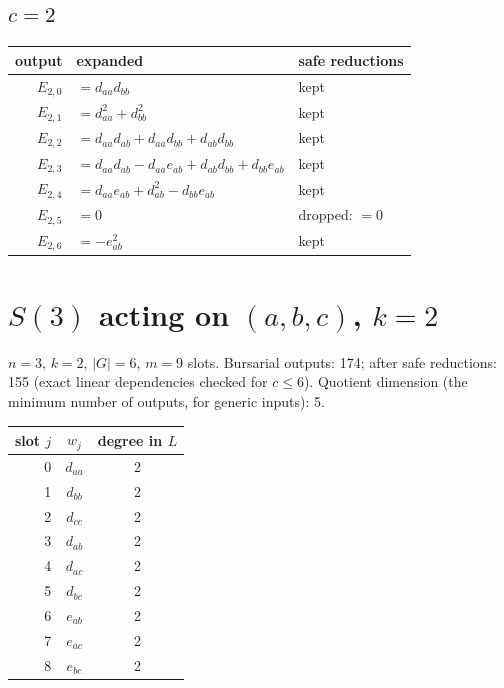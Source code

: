 \documentclass[10pt]{article}
\begin{document}
\subsection*{$c = 2$}
\begin{longtable}{r>{\raggedright\arraybackslash}p{}>{\raggedright\arraybackslash}p{}}
output & expanded & safe reductions \\ \hline
$E_{2,0}$ & $= d_{aa} d_{bb}$ & kept \\
$E_{2,1}$ & $= d_{aa}^{2} + d_{bb}^{2}$ & kept \\
$E_{2,2}$ & $= d_{aa} d_{ab} + d_{aa} d_{bb} + d_{ab} d_{bb}$ & kept \\
$E_{2,3}$ & $= d_{aa} d_{ab} - d_{aa} e_{ab} + d_{ab} d_{bb} + d_{bb} e_{ab}$ & kept \\
$E_{2,4}$ & $= d_{aa} e_{ab} + d_{ab}^{2} - d_{bb} e_{ab}$ & kept \\
$E_{2,5}$ & $= 0$ & dropped: $= 0$ \\
$E_{2,6}$ & $= - e_{ab}^{2}$ & kept \\
\end{longtable}

\clearpage
\section{$S(3)$ acting on $(a, b, c)$, $k = 2$}
$n = 3$, $k = 2$, $|G| = 6$, $m = 9$ slots. Bursarial outputs: 174; after safe reductions: 155 (exact linear dependencies checked for $c \le 6$). Quotient dimension (the minimum number of outputs, for generic inputs): 5.

\begin{longtable}{rcc}
slot $j$ & $w_j$ & degree in $L$ \\ \hline
0 & $d_{aa}$ & 2 \\
1 & $d_{bb}$ & 2 \\
2 & $d_{cc}$ & 2 \\ \hline
3 & $d_{ab}$ & 2 \\
4 & $d_{ac}$ & 2 \\
5 & $d_{bc}$ & 2 \\ \hline
6 & $e_{ab}$ & 2 \\
7 & $e_{ac}$ & 2 \\
8 & $e_{bc}$ & 2 \\ \hline
\end{longtable}
\end{document}
